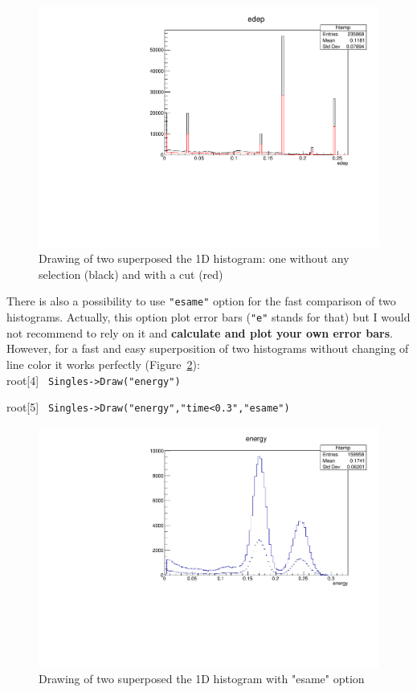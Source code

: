 \documentclass[12pt]{article}
\begin{document}
\begin{figure}[h]
\centering
\includegraphics[scale=0.5]{figs/1Dhist_cut.pdf}
\caption{Drawing of two superposed the 1D histogram: one without any selection (black) and with a cut (red)}
\label{fig:1Dhist_cut}
\end{figure}

There is also a possibility to use \verb|"esame"| option for the fast comparison of two histograms. Actually, this option plot error bars (\verb|"e"| stands for that) but I would not recommend to rely on it and \textbf{calculate and plot your own error bars}. However, for a fast and easy superposition of two histograms without changing of line color it works perfectly (Figure~\ref{fig:1Dhist_esame}):\\

root[4] \verb| Singles->Draw("energy") |

root[5] \verb| Singles->Draw("energy","time<0.3","esame") |\\

\begin{figure}[h]
\centering
\includegraphics[scale=0.5]{figs/1Dhist_esame.pdf}
\caption{Drawing of two superposed the 1D histogram with "esame" option}
\label{fig:1Dhist_esame}
\end{figure}
\end{document}
